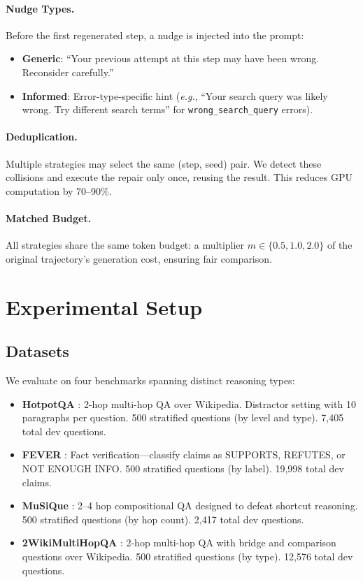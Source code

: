 \documentclass[letterpaper]{article}
\newcommand{\eg}{\textit{e.g.}}
\begin{document}
\paragraph{Nudge Types.} Before the first regenerated step, a nudge is injected into the prompt:
\begin{itemize}
  \item \textbf{Generic}: ``Your previous attempt at this step may have been wrong. Reconsider carefully.''
  \item \textbf{Informed}: Error-type-specific hint (\eg, ``Your search query was likely wrong. Try different search terms'' for \texttt{wrong\_search\_query} errors).
\end{itemize}

\paragraph{Deduplication.} Multiple strategies may select the same (step, seed) pair. We detect these collisions and execute the repair only once, reusing the result. This reduces GPU computation by 70--90\%.

\paragraph{Matched Budget.} All strategies share the same token budget: a multiplier $m \in \{0.5, 1.0, 2.0\}$ of the original trajectory's generation cost, ensuring fair comparison.

\section{Experimental Setup}

\subsection{Datasets}

We evaluate on four benchmarks spanning distinct reasoning types:

\begin{itemize}
  \item \textbf{HotpotQA} \citep{yang2018hotpotqa}: 2-hop multi-hop QA over Wikipedia. Distractor setting with 10 paragraphs per question. 500 stratified questions (by level and type). 7,405 total dev questions.
  \item \textbf{FEVER} \citep{thorne2018fever}: Fact verification---classify claims as SUPPORTS, REFUTES, or NOT ENOUGH INFO. 500 stratified questions (by label). 19,998 total dev claims.
  \item \textbf{MuSiQue} \citep{trivedi2022musique}: 2--4 hop compositional QA designed to defeat shortcut reasoning. 500 stratified questions (by hop count). 2,417 total dev questions.
  \item \textbf{2WikiMultiHopQA} \citep{ho2020constructing}: 2-hop multi-hop QA with bridge and comparison questions over Wikipedia. 500 stratified questions (by type). 12,576 total dev questions.
\end{itemize}
\end{document}
